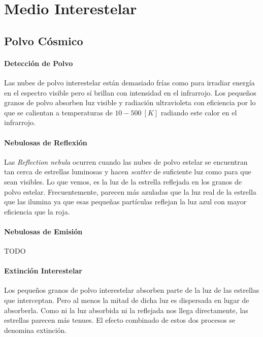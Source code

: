 \documentclass{tufte-handout}
\begin{document}
\section{Medio Interestelar}

\subsection{Polvo Cósmico}

\paragraph{Detección de Polvo}

Las nubes de polvo interestelar están demasiado frías como para irradiar energía en el espectro visible pero sí brillan con intensidad en el infrarrojo. Los pequeños granos de polvo absorben luz visible y radiación ultravioleta con eficiencia por lo que se calientan a temperaturas de $10-500~[K]$ radiando este calor en el infrarrojo.

\paragraph{Nebulosas de Reflexión}

Las \emph{Reflection nebula} ocurren cuando las nubes de polvo estelar se encuentran tan cerca de estrellas luminosas y hacen \emph{scatter} de suficiente luz como para que sean visibles. Lo que vemos, es la luz de la estrella reflejada en los granos de polvo estelar. Frecuentemente, parecen más azuladas que la luz real de la estrella que las ilumina ya que esas pequeñas partículas reflejan la luz azul con mayor eficiencia que la roja.

\paragraph{Nebulosas de Emisión}

TODO

\paragraph{Extinción Interestelar}

Los pequeños granos de polvo interestelar absorben parte de la luz de las estrellas que interceptan. Pero al menos la mitad de dicha luz es dispersada en lugar de absorberla. Como ni la luz absorbida ni la reflejada nos llega directamente, las estrellas parecen más tenues. El efecto combinado de estos dos procesos se denomina extinción.
\end{document}

